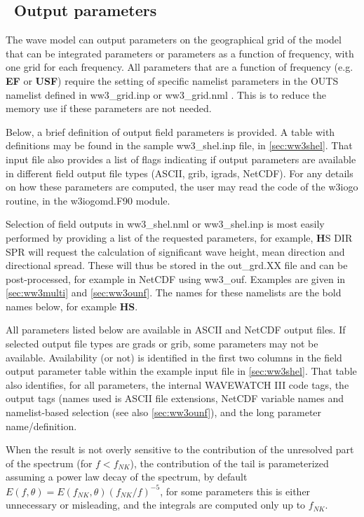 \vssub
\subsection{~Output parameters} \label{sub:outpars}
\vssub

The wave model can output parameters on the geographical grid of the model that can be integrated parameters or 
parameters as a function of frequency, with one grid for each frequency. All parameters that are a function of frequency (e.g.  \textbf{EF} or \textbf{USF}) require the setting 
of specific namelist parameters in the {\F OUTS} namelist defined in ww3\_grid.inp or  ww3\_grid.nml . This is to reduce the memory use
if these parameters are not needed. 

Below, a brief definition of output field parameters is provided. A table
with definitions may be found in the sample {\code ww3\_shel.inp} file,
in \para\ref{sec:ww3shel}. That input file also provides a list of flags  
indicating if output parameters are available in different field
output file types (ASCII, grib, igrads, NetCDF). 
For any details on how these parameters are computed, the user may read the code of the  {\code w3iogo} routine, in the {\code w3iogomd.F90} module. 

Selection of field outputs in {\code ww3\_shel.nml} or {\code ww3\_shel.inp} is most easily performed by providing a list of the 
requested parameters, for example, {\textbf HS DIR SPR}  will request the calculation of significant wave height, mean direction and directional spread. These will thus be stored in the {\code out\_grd.XX} file and can be post-processed, for example in NetCDF using   {\code ww3\_ouf}. Examples are given in \para\ref{sec:ww3multi} and
\para\ref{sec:ww3ounf}. The names for these namelists are the bold names below, for 
example \textbf{HS}. 

All parameters listed below are available in ASCII and NetCDF output files. If selected output file types are grads or grib, some parameters may not be available. Availability (or not) is identified
in the first two columns in the field output parameter table within the example input file in  
\para\ref{sec:ww3shel}. That table also identifies, for all parameters,
the internal WAVEWATCH III code tags, the output tags (names used is ASCII 
file extensions, NetCDF variable names and namelist-based selection (see 
also \para\ref{sec:ww3ounf}), and the long parameter name/definition.

When the result is not overly sensitive to the contribution of the unresolved part of the spectrum (for $f<f_{NK}$), the contribution of the tail is parameterized assuming a power law decay of the spectrum, by default $E(f,\theta) = E(f_{NK},\theta) (f_{NK}/f)^{-5}$, for some parameters this is either unnecessary or misleading, and the integrals are computed only up to $f_{NK}$. 


